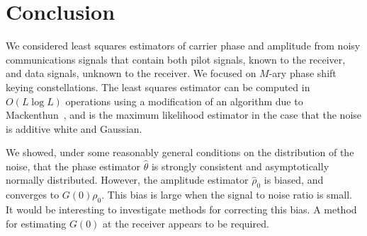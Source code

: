 \documentclass[journal]{IEEEtran}
\begin{document}




\section{Conclusion}

We considered least squares estimators of carrier phase and amplitude from noisy communications signals that contain both pilot signals, known to the receiver, and data signals, unknown to the receiver.  We focused on $M$-ary phase shift keying constellations.  The least squares estimator can be computed in $O(L\log L)$ operations using a modification of an algorithm due to Mackenthun~\cite{Mackenthun1994}, and is the maximum likelihood estimator in the case that the noise is additive white and Gaussian.  

We showed, under some reasonably general conditions on the distribution of the noise, that the phase estimator $\hat{\theta}$ is strongly consistent and asymptotically normally distributed.  However, the amplitude estimator $\hat{\rho}_0$ is biased, and converges to $G(0)\rho_0$.  This bias is large when the signal to noise ratio is small.  It would be interesting to investigate methods for correcting this bias.  A method for estimating $G(0)$ at the receiver appears to be required.
\end{document}
